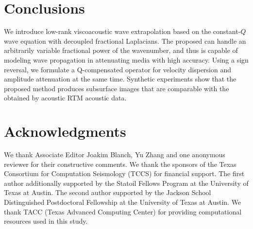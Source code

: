 \section{Conclusions}
We introduce low-rank viscoacoustic wave extrapolation  based on the constant-$Q$ wave equation with decoupled fractional Laplacians. The proposed  can handle an arbitrarily variable fractional power of the wavenumber, and thus is capable of modeling wave propagation in attenuating media with high accuracy. Using a sign reversal, we formulate a Q-compensated operator  for velocity dispersion and amplitude attenuation at the same time.  Synthetic experiments show that the proposed method produces  subsurface images that are comparable with the  obtained by acoustic RTM  acoustic data.


\section{Acknowledgments}
We thank Associate Editor Joakim Blanch, Yu Zhang and one anonymous reviewer for their constructive comments. We thank the sponsors of the Texas Consortium for Computation Seismology (TCCS) for financial support. The first author  additionally supported by the Statoil Fellows Program at the University of Texas at Austin. The second author  supported by the Jackson School Distinguished Postdoctoral Fellowship at the University of Texas at Austin.  We thank TACC (Texas Advanced Computing Center) for providing computational resources used in this study.



